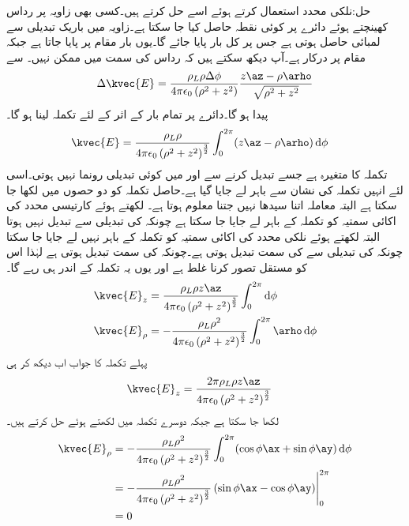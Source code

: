 حل:نلکی محدد استعمال کرتے ہوئے اسے حل کرتے ہیں۔کسی بھی زاویہ پر رداس کھینچتے ہوئے دائرے پر کوئی نقطہ حاصل کیا جا سکتا ہے۔زاویہ میں باریک تبدیلی  سے لمبائی  حاصل ہوتی ہے جس پر کل بار  پایا جائے گا۔یوں بار  مقام  پر پایا جاتا ہے جبکہ  مقام  پر درکار ہے۔آپ دیکھ سکتے ہیں کہ  رداس کی سمت میں ممکن نہیں۔ سے
\begin{align*}
\Delta \kvec{E}=\frac{\rho_L \rho \Delta \phi}{4\pi\epsilon_0 \left(\rho^2+z^2 \right)} \frac{z\az-\rho \arho}{\sqrt{\rho^2+z^2}}
\end{align*}
پیدا ہو گا۔دائرے پر تمام بار کے اثر کے لئے تکملہ لینا ہو گا۔
\begin{align*}
\kvec{E}&=\frac{\rho_L \rho}{4\pi\epsilon_0  \left(\rho^2+z^2 \right)^{\frac{3}{2}}}\int_{0}^{2\pi}(z\az-\rho \arho) \dif \phi
\end{align*}
تکملہ کا متغیرہ  ہے جسے تبدیل کرنے سے  اور  میں کوئی تبدیلی رونما نہیں ہوتی۔اسی لئے انہیں تکملہ کی نشان سے باہر لے جایا گیا ہے۔حاصل تکملہ کو دو حصوں میں لکھا جا سکتا ہے البتہ معاملہ اتنا سیدھا نہیں جتنا معلوم ہوتا ہے۔ لکھتے ہوئے کارتیسی محدد کی اکائی سمتیہ  کو تکملہ کے باہر لے جایا جا سکتا ہے چونکہ  کی تبدیلی سے  تبدیل نہیں ہوتا البتہ   لکھتے ہوئے نلکی محدد کی اکائی سمتیہ  کو تکملہ کے باہر نہیں لے جایا جا سکتا چونکہ  کی تبدیلی سے   کی سمت تبدیل ہوتی ہے۔چونکہ  کی سمت تبدیل ہوتی ہے لہٰذا اس کو مستقل تصور کرنا غلط ہے اور یوں یہ تکملہ کے اندر ہی رہے گا۔ 
\begin{gather}
\begin{aligned}
\kvec{E}_z&=\frac{\rho_L \rho z \az}{4\pi\epsilon_0  \left(\rho^2+z^2 \right)^{\frac{3}{2}}}\int_{0}^{2\pi} \dif \phi\\
\kvec{E}_{\rho}&=-\frac{\rho_L \rho^2}{4\pi\epsilon_0  \left(\rho^2+z^2 \right)^{\frac{3}{2}}}\int_{0}^{2\pi} \arho \dif \phi
\end{aligned}
\end{gather}
پہلے تکملہ کا جواب اب دیکھ کر ہی
\begin{align}
\kvec{E}_z&=\frac{2\pi \rho_L \rho z \az}{4\pi\epsilon_0  \left(\rho^2+z^2 \right)^{\frac{3}{2}}}
\end{align}
لکھا جا سکتا ہے جبکہ دوسرے تکملہ میں  لکھتے ہوئے حل کرتے ہیں۔
\begin{align*}
\kvec{E}_{\rho}&=-\frac{\rho_L \rho^2}{4\pi\epsilon_0  \left(\rho^2+z^2 \right)^{\frac{3}{2}}}\int_{0}^{2\pi} (\cos \phi \ax+\sin \phi \ay) \dif \phi\\
&=-\frac{\rho_L \rho^2}{4\pi\epsilon_0  \left(\rho^2+z^2 \right)^{\frac{3}{2}}} \eval{ (\sin \phi \ax-\cos \phi \ay) }_{0}^{2\pi}\\
&=0
\end{align*}

